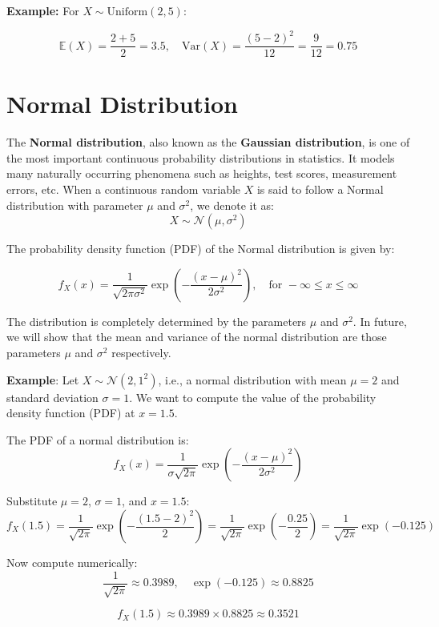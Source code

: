 \documentclass[twoside]{book}
\begin{document}
\vspace{2mm}

\textbf{Example:} For $X \sim \text{Uniform}(2, 5)$:

\[
\mathbb{E}(X) = \frac{2 + 5}{2} = 3.5, \quad \text{Var}(X) = \frac{(5 - 2)^2}{12} = \frac{9}{12} = 0.75
\]


\section{Normal Distribution}

The \textbf{Normal distribution}, also known as the \textbf{Gaussian distribution}, is one of the most important continuous probability distributions in statistics. It models many naturally occurring phenomena such as heights, test scores, measurement errors, etc. When a continuous random variable $X$ is said to follow a {Normal distribution} with parameter $\mu$ and $\sigma^2$, we denote it as:
\[
X \sim \mathcal{N}(\mu, \sigma^2)
\]

The probability density function (PDF) of the Normal distribution is given by:
\begin{textbox}
\[
f_X(x) = \frac{1}{\sqrt{2\pi\sigma^2}} \exp\left( -\frac{(x - \mu)^2}{2\sigma^2} \right), \quad \text{for } -\infty \leq x \leq \infty
\]
\end{textbox}

The distribution is completely determined by the parameters $\mu$ and $\sigma^2$. In future, we will show that the mean and variance of the normal distribution are those parameters $\mu$ and $\sigma^2$ respectively.

\textbf{Example}: Let $X \sim \mathcal{N}(2, 1^2)$, i.e., a normal distribution with mean $\mu = 2$ and standard deviation $\sigma = 1$.
We want to compute the value of the probability density function (PDF) at $x = 1.5$.

The PDF of a normal distribution is:
\[
f_X(x) = \frac{1}{\sigma\sqrt{2\pi }} \exp\left( -\frac{(x - \mu)^2}{2\sigma^2} \right)
\]

Substitute $\mu = 2$, $\sigma = 1$, and $x = 1.5$:
\[
f_X(1.5) = \frac{1}{\sqrt{2\pi}} \exp\left( -\frac{(1.5 - 2)^2}{2} \right)
= \frac{1}{\sqrt{2\pi}} \exp\left( -\frac{0.25}{2} \right)
= \frac{1}{\sqrt{2\pi}} \exp(-0.125)
\]

Now compute numerically:
\[
\frac{1}{\sqrt{2\pi}} \approx 0.3989, \quad \exp(-0.125) \approx 0.8825
\]

\[
f_X(1.5) \approx 0.3989 \times 0.8825 \approx 0.3521
\]
\end{document}
